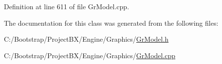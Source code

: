 Definition at line 611 of file GrModel.cpp.

The documentation for this class was generated from the following files:\begin{CompactItemize}
\item 
C:/Bootstrap/ProjectBX/Engine/Graphics/\hyperlink{_gr_model_8h}{GrModel.h}\item 
C:/Bootstrap/ProjectBX/Engine/Graphics/\hyperlink{_gr_model_8cpp}{GrModel.cpp}\end{CompactItemize}

